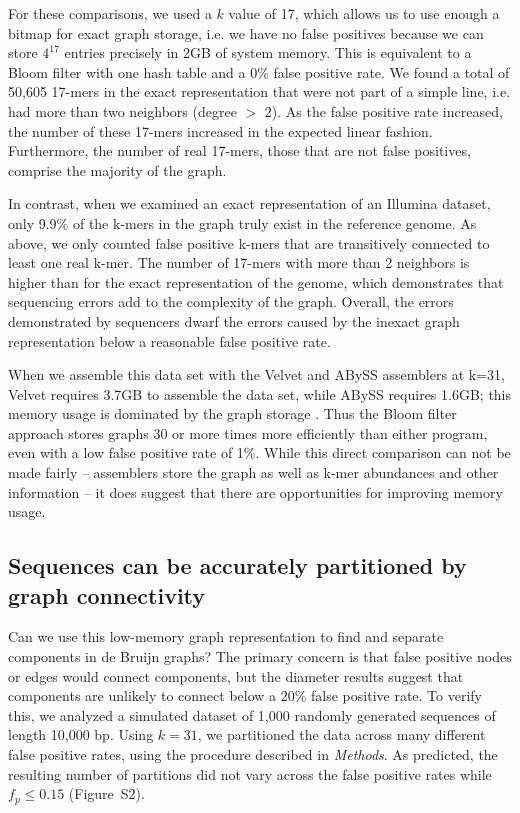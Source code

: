 \documentclass{pnastwo}
\begin{document}
\begin{article}
For these comparisons, we used a $k$ value of 17, which allows us to
use enough a bitmap for exact graph storage, i.e. we have no false
positives because we can store $4^{17}$ entries precisely in 2GB of
system memory. This is equivalent to a Bloom filter with one hash
table and a 0\% false positive rate.  We found a total of 50,605
17-mers in the exact representation that were not part of a simple
line, i.e. had more than two neighbors (degree $>$ 2). As the false
positive rate increased, the number of these 17-mers increased in the
expected linear fashion.
Furthermore, the number of real 17-mers, those that are not false
positives, comprise the majority of the graph.

In contrast, when we examined an exact representation of an Illumina
dataset, only 9.9\% of the k-mers in the graph truly exist in the
reference genome.  As above, we only counted false positive k-mers
that are transitively connected to least one real k-mer. The number of
17-mers with more than 2 neighbors is higher than for the exact
representation of the genome, which demonstrates that sequencing
errors add to the complexity of the graph. Overall, the errors
demonstrated by sequencers dwarf the errors caused by the inexact
graph representation below a reasonable false positive rate.

When we assemble this data set with the Velvet and ABySS assemblers at
k=31, Velvet requires 3.7GB to assemble the data set, while ABySS
requires 1.6GB; this memory usage is dominated by the graph storage
\cite{zerbinothesis}. Thus the Bloom filter approach stores graphs 30
or more times more efficiently than either program, even with a low
false positive rate of 1\%.  While this direct comparison can not be
made fairly -- assemblers store the graph as well as k-mer abundances
and other information -- it does suggest that there are opportunities
for improving memory usage.

\subsection{Sequences can be accurately partitioned by graph connectivity}


Can we use this low-memory graph representation to find and separate
components in de Bruijn graphs?  The primary concern is that false
positive nodes or edges would connect components, but the diameter
results suggest that components are unlikely to connect below a 20\%
false positive rate.  To verify this, we analyzed a simulated dataset
of 1,000 randomly generated sequences of length 10,000 bp.  Using
$k=31$, we partitioned the data across many different false positive
rates, using the procedure described in \emph{Methods}. As predicted,
the resulting number of partitions did not vary across the false
positive rates while $f_p \le 0.15$ (Figure~S2).


\end{article}
\end{document}
